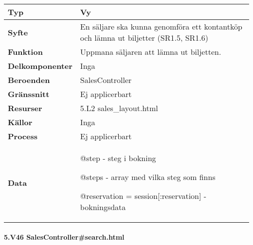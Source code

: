 \documentclass[a4paper, twoside, 11pt, titlepage]{article}
\begin{document}
			\begin {table} [ht] \begin{tabular} {  p{3.5cm} p{11.6cm} }
				\hline
				{\sffamily\textbf{Typ}} & {Vy} \\
				\hline
				{\sffamily\textbf{Syfte}} & {En säljare ska kunna genomföra ett kontantköp och lämna ut biljetter (SR1.5, SR1.6)} \\
				\hline
				{\sffamily\textbf{Funktion}} & {Uppmana säljaren att lämna ut biljetten.} \\
				\hline
				{\sffamily\textbf{Delkomponenter}} & {Inga} \\
				\hline
				{\sffamily\textbf{Beroenden}} & {SalesController} \\
				\hline
				{\sffamily\textbf{Gränssnitt}} & {Ej applicerbart} \\
				\hline
				{\sffamily\textbf{Resurser}} & {5.L2 sales\_layout.html} \\
				\hline
				{\sffamily\textbf{Källor}} & {Inga} \\
				\hline
				{\sffamily\textbf{Process}} & {Ej applicerbart} \\
				\hline
				{\sffamily\textbf{Data}} & {@step - steg i bokning

@steps - array med vilka steg som finns

@reservation = session[:reservation] - bokningsdata} \\
				\hline
			\end{tabular} \end{table} \FloatBarrier


			\clearpage %
			\paragraph{5.V46 SalesController\#search.html}\
\end{document}

